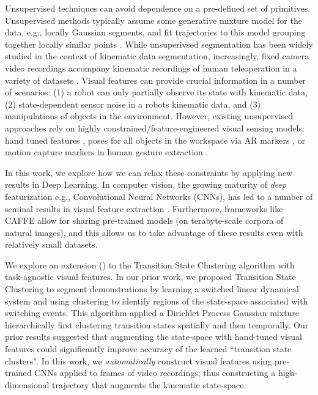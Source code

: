 Unsupervised techniques can avoid dependence on a pre-defined set of primitives.
Unsupervised methods typically assume some generative mixture model for the data, e.g., locally Gaussian segments, and fit trajectories to this model grouping together locally similar points \cite{calinon2010learning, krishnan2015tsc, calinon2004stochastic, kruger2010learning, fox2009nonparametric, oh2005learning}.
While unsuperivsed segmentation has been widely studied in the context of kinematic data segmentation, increasingly, fixed camera video recordings accompany kinematic recordings of human teleoperation in a variety of datasets \cite{hodgins2009guide, gao2014jigsaws, ofli2013berkeley}.
Visual features can provide crucial information in a number of scenarios: (1) a robot can only partially observe its state with kinematic data, (2) state-dependent sensor noise in a robots kinematic data, and (3) manipulations of objects in the environment.
However, existing unsupervised approaches rely on highly constrained/feature-engineered visual sensing models: hand tuned features \cite{krishnan2015tsc}, poses for all objects in the workspace via AR markers \cite{Niekum2015learning}, or motion capture markers in human gesture extraction \cite{kulic2011incremental}.



In this work, we explore how we can relax these constraints by applying new results in Deep Learning.
In computer vision, the growing maturity of \emph{deep} featurization e.g., Convolutional Neural Networks (CNNs), has led to a number of seminal results in visual feature extraction \cite{krizhevsky2012imagenet, lecun1995convolutional, jia2014caffe, long2014fully}.
Furthermore, frameworks like CAFFE \cite{jia2014caffe} allow for sharing pre-trained models (on terabyte-scale corpora of natural images), and this allows us to take advantage of these results even with relatively small datasets.

We explore an extension (\sys) to the Transition State Clustering algorithm \cite{krishnan2015tsc} with task-agnostic visual features.
In our prior work, we proposed Transition State Clustering to segment demonstrations by learning a switched linear dynamical system and using clustering to identify regions of the state-space associated with switching events.
This algorithm applied a Dirichlet Process Gaussian mixture hierarchically first clustering transition states spatially and then temporally.
Our prior results suggested that augmenting the state-space with hand-tuned visual features could significantly improve accuracy of the learned ``transition state clusters".
In this work, we \emph{automatically} construct visual features using pre-trained CNNs applied to frames of video recordings; thus constructing a high-dimensional trajectory that augments the kinematic state-space.

